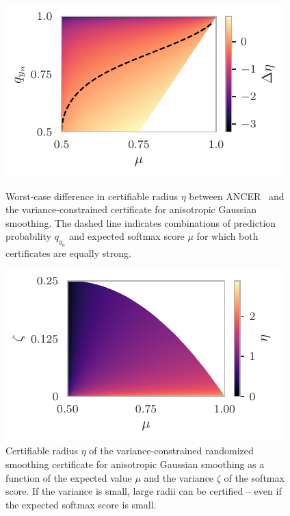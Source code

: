 \begin{figure}[hb]
	\centering
	\begin{minipage}{0.49\columnwidth}
		\centering
		\includegraphics[width=\textwidth]{figures/experiments/variance_vs_ancer/variance_constrained_worstcase_appendix.pdf}
		\caption{Worst-case difference in certifiable radius $\eta$ between ANCER~\citep{Eiras2021} and the variance-constrained certificate for anisotropic Gaussian smoothing. The dashed line indicates combinations of prediction probability $q_{y_n}$ and expected softmax score $\mu$ for which both certificates are equally strong.
		}
		\label{fig:variance_vs_ancer}
	\end{minipage}
	\hfill
	\begin{minipage}{0.49\columnwidth}
		\centering
		\includegraphics[width=\textwidth]{figures/experiments/variance_vs_ancer/variance_constrained_parameters.pdf}
		\caption{Certifiable radius $\eta$ of the variance-constrained randomized smoothing certificate for anisotropic Gaussian smoothing as a function of the expected value $\mu$ and the variance $\zeta$ of the softmax score.
        If the variance is small, large radii can be certified -- even if the expected softmax score is small.
		}
		\label{fig:variance_parameters}
	\end{minipage}
\end{figure}

